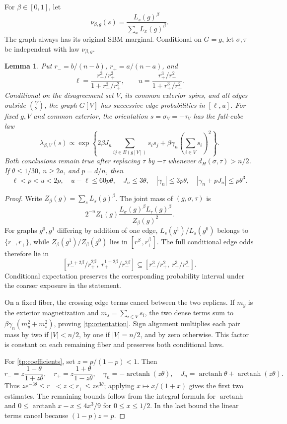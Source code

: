 \documentclass[11pt]{article}
\newtheorem{lemma}[thm]{Lemma}
\numberwithin{equation}{section}
\begin{document}
For $\beta\in[0,1]$, let
\[
 \nu_{\beta,g}(s)=\frac{L_s(g)^\beta}{\sum_x L_x(g)^\beta}.
\]
The graph always has its original SBM marginal. Conditional on $G=g$, let $\sigma,\tau$ be independent with law $\nu_{\beta,g}$.

\begin{lemma}\label{tp:replicas}
Put $r_-=b/(n-b)$, $r_+=a/(n-a)$, and
\[
 \ell=\frac{r_-^3/r_+^2}{1+r_-^3/r_+^2},\qquad
 u=\frac{r_+^3/r_-^2}{1+r_+^3/r_-^2}.
\]
Conditional on the disagreement set $V$, its common exterior spins, and all edges outside $\binom V2$, the graph $G[V]$ has successive edge probabilities in $[\ell,u]$. For fixed $g,V$ and common exterior, the orientation $s=\sigma_V=-\tau_V$ has the full-cube law
\begin{equation}\label{tp:orientation}
 \lambda_{\beta,V}(s)\propto
 \exp\left\{2\beta J_n\sum_{ij\in E(g[V])}s_is_j
       +\beta\gamma_n\left(\sum_{i\in V}s_i\right)^2\right\}.
\end{equation}
Both conclusions remain true after replacing $\tau$ by $-\tau$ whenever $d_H(\sigma,\tau)>n/2$. If $\theta\le1/30$, $n\ge2a$, and $p=d/n$, then
\begin{equation}\label{tp:coefficients}
 \ell<p<u<2p,\quad u-\ell\le60p\theta,\quad
 J_n\le3\theta,\quad |\gamma_n|\le3p\theta,\quad
 |\gamma_n+pJ_n|\le p\theta^3.
\end{equation}
\end{lemma}
\begin{proof}
Write $Z_\beta(g)=\sum_sL_s(g)^\beta$. The joint mass of $(g,\sigma,\tau)$ is
\[
 2^{-n}Z_1(g)\frac{L_\sigma(g)^\beta L_\tau(g)^\beta}{Z_\beta(g)^2}.
\]
For graphs $g^0,g^1$ differing by addition of one edge, $L_s(g^1)/L_s(g^0)$ belongs to $\{r_-,r_+\}$, while $Z_\beta(g^1)/Z_\beta(g^0)$ lies in $[r_-^\beta,r_+^\beta]$. The full conditional edge odds therefore lie in
\[
 [r_-^{1+2\beta}/r_+^{2\beta},\ r_+^{1+2\beta}/r_-^{2\beta}]
 \subseteq[r_-^3/r_+^2,\ r_+^3/r_-^2].
\]
Conditional expectation preserves the corresponding probability interval under the coarser exposure in the statement.

On a fixed fiber, the crossing edge terms cancel between the two replicas. If $m_y$ is the exterior magnetization and $m_s=\sum_{i\in V}s_i$, the two dense terms sum to $\beta\gamma_n(m_y^2+m_s^2)$, proving \eqref{tp:orientation}. Sign alignment multiplies each pair mass by two if $|V|<n/2$, by one if $|V|=n/2$, and by zero otherwise. This factor is constant on each remaining fiber and preserves both conditional laws.

For \eqref{tp:coefficients}, set $z=p/(1-p)<1$. Then
\[
 r_-=z\frac{1-\theta}{1+z\theta},\quad
 r_+=z\frac{1+\theta}{1-z\theta},\quad
 \gamma_n=-\operatorname{arctanh}(z\theta),\quad
 J_n=\operatorname{arctanh}\theta+\operatorname{arctanh}(z\theta).
\]
Thus $ze^{-3\theta}\le r_-<z<r_+\le ze^{3\theta}$; applying $x\mapsto x/(1+x)$ gives the first two estimates. The remaining bounds follow from the integral formula for $\operatorname{arctanh}$ and
$0\le\operatorname{arctanh}x-x\le4x^3/9$ for $0\le x\le1/2$. In the last bound the linear terms cancel because $(1-p)z=p$.
\end{proof}
\end{document}
